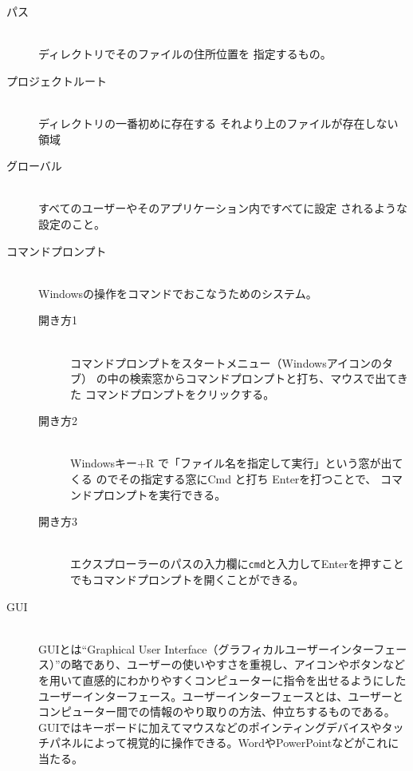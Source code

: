 \documentclass[titlepage]{ltjsarticle}
\begin{document}
\begin{description}
  \item [パス] ~\\
    ディレクトリでそのファイルの住所位置を
    指定するもの。
  \item [プロジェクトルート] ~\\
    ディレクトリの一番初めに存在する
    それより上のファイルが存在しない領域
  \item [グローバル] ~\\
    すべてのユーザーやそのアプリケーション内ですべてに設定
    されるような設定のこと。
  \item [コマンドプロンプト] ~\\
    Windowsの操作をコマンドでおこなうためのシステム。
    \begin{description}
      \item[開き方1] ~\\
      コマンドプロンプトをスタートメニュー（Windowsアイコンのタブ）
      の中の検索窓からコマンドプロンプトと打ち、マウスで出てきた
      コマンドプロンプトをクリックする。
      \item[開き方2] ~\\
      Windowsキー+R で「ファイル名を指定して実行」という窓が出てくる
      のでその指定する窓にCmd と打ち Enterを打つことで、
      コマンドプロンプトを実行できる。
      \item[開き方3]~\\
      エクスプローラーのパスの入力欄に\verb|cmd|と入力してEnterを押すことでもコマンドプロンプトを開くことができる。 
    \end{description}
    \item[GUI]~\\
      GUIとは``Graphical User Interface（グラフィカルユーザーインターフェース）''の略であり、ユーザーの使いやすさを重視し、アイコンやボタンなどを用いて直感的にわかりやすくコンピューターに指令を出せるようにしたユーザーインターフェース。ユーザーインターフェースとは、ユーザーとコンピューター間での情報のやり取りの方法、仲立ちするものである。GUIではキーボードに加えてマウスなどのポインティングデバイスやタッチパネルによって視覚的に操作できる。WordやPowerPointなどがこれに当たる。

\end{description}
\end{document}
